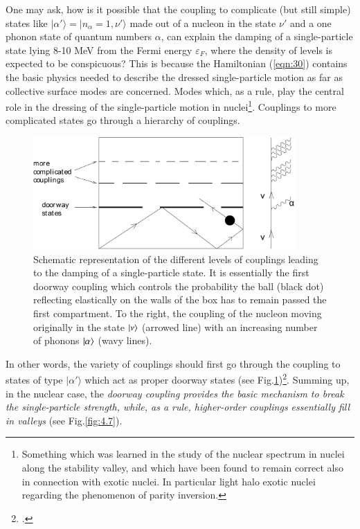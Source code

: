 One may ask, how  is it possible that the coupling to complicate (but still simple) states like $|\alpha'\rangle = |n_\alpha = 1,\nu'\rangle$ made out of a nucleon in the state $\nu'$ and a one phonon state of quantum numbers $\alpha$, can explain the  damping of a single-particle state lying 8-10 MeV from the Fermi energy $\varepsilon_F$, where the density of levels  is expected to be conspicuous? This is because the Hamiltonian  (\ref{eqn:30}) contains  the basic physics needed to describe the dressed single-particle motion as far as collective surface modes are concerned. Modes which, as a rule, play the central role in the dressing of the single-particle motion in nuclei\footnote{Something which was learned in the study of the nuclear spectrum in nuclei along the stability valley, and which have been found to remain correct also in connection with exotic nuclei. In particular light halo exotic nuclei regarding the phenomenon of parity inversion.}. Couplings to more complicated states  go through a hierarchy of couplings.
\begin{figure}[h!]
\centerline {
\includegraphics*[width=10cm]{introduccion/figs/figintroD6}
}
\caption{Schematic representation of the different levels of couplings leading to the damping of a single-particle state. It is essentially the first doorway coupling which controls the probability the ball (black dot) reflecting elastically on the walls of the box has to remain passed the first compartment. To the right, the coupling of the nucleon moving originally in the state $|{\nu} \rangle$ (arrowed line) with an increasing number of phonons $|{\alpha} \rangle$ (wavy lines).}
\label{fig:4.6}
\end{figure}
In other words, the variety of couplings  should first go  through the coupling to states of type $|\alpha'\rangle$ which act as proper doorway states (see Fig.\ref{fig:4.6})\footnote{\cite{Feshbach:58}.}. Summing up, in  the nuclear case, the {\it doorway coupling provides the basic mechanism to break  the single-particle strength, while, as a rule, higher-order couplings essentially   fill in valleys} (see Fig.\ref{fig:4.7}).


